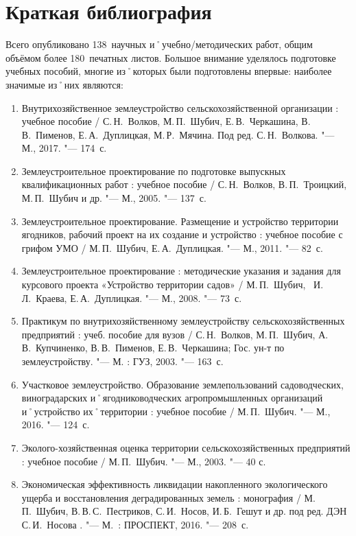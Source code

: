 ﻿\section{Краткая библиография}

Всего опубликовано 138~научных и˚учебно\-/методических работ, общим объёмом более 180~печатных листов. Большое внимание уделялось подготовке учебных пособий, многие из˚которых были подготовлены впервые: наиболее значимые из˚них являются: 

\begin{enumerate}
	\item Внутрихозяйственное землеустройство сельскохозяйственной организации : учебное пособие / С.\,Н.~Волков, М.\,П.~Шубич, Е.\,В.~Черкашина, В.\,В.~Пименов, Е.\,А.~Дуплицкая, М.\,Р.~Мячина. Под ред. С.\,Н.~Волкова. "--- М., 2017. "--- 174~с.
	\item Землеустроительное проектирование по подготовке выпускных квалификационных работ : учебное пособие / С.\,Н.~Волков, В.\,П.~Троицкий, М.\,П.~Шубич и др. "--- М., 2005. "--- 137~с.
	\item Землеустроительное проектирование. Размещение и устройство территории ягодников, рабочий проект на их создание и устройство : учебное пособие с грифом УМО / М.\,П.~Шубич, Е.\,А.~Дуплицкая. "--- М., 2011. "--- 82~с.
	\item Землеустроительное проектирование : методические указания и задания для курсового проекта «Устройство территории садов» / М.\,П.~Шубич, \ И.\,Л.~Краева, Е.\,А.~Дуплицкая. "--- М., 2008. "--- 73~с.
	\item Практикум по внутрихозяйственному землеустройству сельскохозяйственных предприятий : учеб. пособие для вузов / С.\,Н.~Волков, М.\,П.~Шубич, А.\,В.~Купчиненко, В.\,В.~Пименов, Е.\,В.~Черкашина; Гос. ун-т по землеустройству. "--- М. : ГУЗ, 2003. "--- 163~с.
	\item Участковое землеустройство. Образование землепользований садоводческих, виноградарских и˚ягодниководческих агропромышленных организаций и˚устройство их˚территории : учебное пособие / М.\,П.~Шубич. "--- М., 2016. "--- 124~с.	
	\item Эколого-хозяйственная оценка территории сельскохозяйственных предприятий : учебное пособие / М.\,П.~Шубич. "--- М., 2003. "--- 40 с.
	\item Экономическая эффективность ликвидации накопленного экологического ущерба и восстановления деградированных земель : монография /  М.\,П.~Шубич, В.\,В.\,С.~Пестриков, С.\,И.~Носов, И.\,Б.~Гешут и др. под ред. ДЭН С.\,И.~Носова . "--- М.~: ПРОСПЕКТ, 2016. "--- 208~с.
\end{enumerate}
